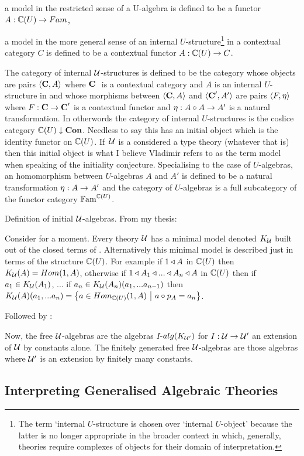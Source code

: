 {\begin{point}
 a model in the restricted sense of a U-algebra is defined to be a functor $A: \ccat[C](U) \morph Fam$, 
\end{point}
\begin{point}
a model in the more general sense of an internal $U$-structure\footnote{The  term `internal $U$-structure is chosen over `internal $U$-object' because the latter
is no longer appropriate in the broader context in which, generally, theories require complexes of objects for their domain of interpretation.} in a contextual category
$C$ is defined to be a contextual functor $A: \ccat[C](U) \morph C$.
\end{point}
The category of internal $\gat[U]$-structures is defined to be the category whose objects
are pairs $\tuple{\catc,A}$ 
where $\catcw$ is a contextual 
category and $A$ is an internal 
$U$-structure in
 \catcw and whose morphisms between $\tuple{\catc,A}$ and $\tuple{\catc',A'}$ are pairs $\tuple{F, \eta}$ where
$F: \catc \morph \catc'$ is a contextual functor and $\eta: A \circ A \morph  A'$ is a natural transformation.
In otherwords the category of internal $U$-structures
is  the coslice category
$\CofU \downarrow \catCon$. Needless to say this has an initial object which is the identity functor on  $\CofU$.
If\ $\gat[U]$ is a considered a type theory (whatever that is) then this initial object is what I believe Vladimir refers
to as the term model when speaking of the initiality conjecture. 
Specialising to the case of $U$-algebras,  an homomorphism between $U$-algebras $A$ and $A'$ is defined to be a 
natural transformation $\eta: A \morph A'$ and the category of $U$-algebras is a full subcategory of the 
functor category $\Fam^{\CofU}$. 

\note 
Definition of initial $\gat[U]$-algebras. From my thesis:
\begin{tightquote}
Consider for a moment. Every theory $\gat[U]$ has a minimal model denoted $\KU$ built out of the closed terms of \gat[U]. Alternatively this minimal model is described just in terms of the structure $\CofU$. For example
if $1 \base A$ in $\CofU$ then 
$\KU(A)=Hom(1,A)$, otherwise if $1 \base A_1 \base ... \base A_n \base A$ in $\CofU$
then if $a_1 \in \KU(A_1)$, ... if $a_n \in \KU(A_n)(a_1,...a_{n-1})$ then 
$\KU(A)(a_1,...a_n)=\setsuchthat{a\in Hom_{\CofU}(1,A)}{a \circ p_A = a_n}$. \\
\end{tightquote} 

Followed by :
\begin{tightquote}
Now, the free $\gat[U]$-algebras are the algebras $I$-$alg(\KUp)$ for $I: \gat[U] \morph \gat[U']$ an extension of $\gat[U]$ by constants alone. The finitely generated free $\gat[U]$-algebras are those algebras where $\gat[U']$ is an extension by finitely many constants. \\
\end{tightquote}

\subsection{Interpreting Generalised Algebraic Theories}}
